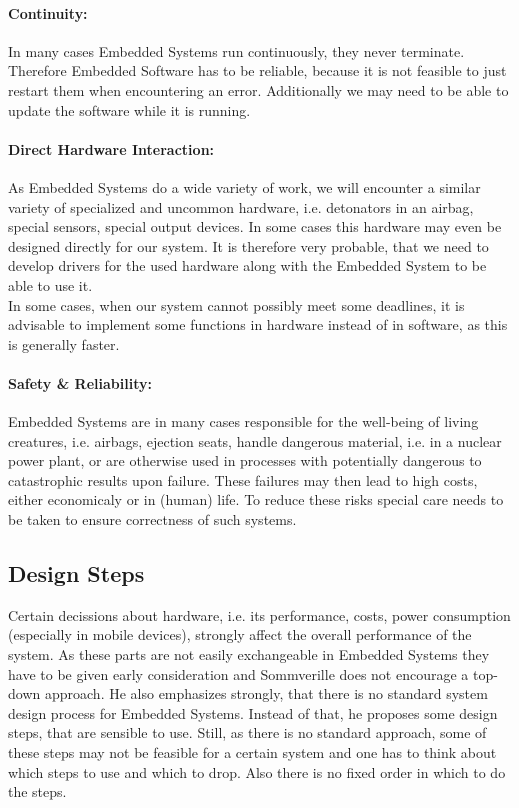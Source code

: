 \documentclass[10pt,a4paper,titlepage,draft]{article} %
\begin{document}
\paragraph{Continuity:}
In many cases Embedded Systems run continuously, they never terminate.
Therefore Embedded Software has to be reliable, because it is not feasible to just restart them when encountering an error.
Additionally we may need to be able to update the software while it is running.

\paragraph{Direct Hardware Interaction:}
As Embedded Systems do a wide variety of work, we will encounter a similar variety of specialized and uncommon hardware, i.e. detonators in an airbag, special sensors, special output devices.
In some cases this hardware may even be designed directly for our system.
It is therefore very probable, that we need to develop drivers for the used hardware along with the Embedded System to be able to use it.
\\
In some cases, when our system cannot possibly meet some deadlines, it is advisable to implement some functions in hardware instead of in software, as this is generally faster.

\paragraph{Safety \& Reliability:}
Embedded Systems are in many cases responsible for the well-being of living creatures, i.e. airbags, ejection seats, handle dangerous material, i.e. in a nuclear power plant, or are otherwise used in processes with potentially dangerous to catastrophic results upon failure.
These failures may then lead to high costs, either economicaly or in (human) life.
To reduce these risks special care needs to be taken to ensure correctness of such systems.

\subsection{Design Steps}
Certain decissions about hardware, i.e. its performance, costs, power consumption (especially in mobile devices), strongly affect the overall performance of the system.
As these parts are not easily exchangeable in Embedded Systems they have to be given early consideration and Sommverille does not encourage a top-down approach\cite[p. 540]{sommerville}.
He also emphasizes strongly, that there is no standard system design process for Embedded Systems.
Instead of that, he proposes some design steps, that are sensible to use.
Still, as there is no standard approach, some of these steps may not be feasible for a certain system and one has to think about which steps to use and which to drop.
Also there is no fixed order in which to do the steps.
\end{document}
